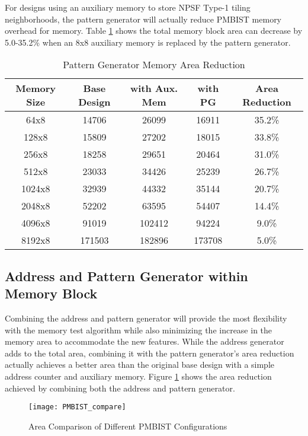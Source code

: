 For designs using an auxiliary memory to store NPSF Type-1 tiling neighborhoods, the pattern generator will actually reduce PMBIST memory overhead for memory.  Table \ref{tab:pg_memory_overhead} shows the total memory block area can decrease by 5.0-35.2\% when an 8x8 auxiliary memory is replaced by the pattern generator.  

\begin{table}[h]
\caption{Pattern Generator Memory Area Reduction}
\centering
\begin{tabular}{|c| c| c| c| c|}
\hline
Memory Size & Base Design & with Aux. Mem & with PG & Area Reduction \\
\hline\hline
64x8   & 14706  & 26099  & 16911  & 35.2\% \\
128x8  & 15809  & 27202  & 18015  & 33.8\% \\
256x8  & 18258  & 29651  & 20464  & 31.0\% \\
512x8  & 23033  & 34426  & 25239  & 26.7\% \\
1024x8 & 32939  & 44332  & 35144  & 20.7\% \\
2048x8 & 52202  & 63595  & 54407  & 14.4\% \\
4096x8 & 91019  & 102412 & 94224  &  9.0\% \\
8192x8 & 171503 & 182896 & 173708 &  5.0\% \\ [0.5ex]
\hline
\end{tabular}
\label{tab:pg_memory_overhead}
\end{table}

\subsection{Address and Pattern Generator within Memory Block}
Combining the address and pattern generator will provide the most flexibility with the memory test algorithm while also minimizing the increase in the memory area to accommodate the new features.  While the address generator adds to the total area, combining it with the pattern generator's area reduction actually achieves a better area than the original base design with a simple address counter and auxiliary memory.  Figure \ref{fig:all_compare} shows the area reduction achieved by combining both the address and pattern generator.

\begin{figure}[h]
  \centering
  \texttt{[image: PMBIST\_compare]}
  \caption{Area Comparison of Different PMBIST Configurations}
  \label{fig:all_compare}
\end{figure}

